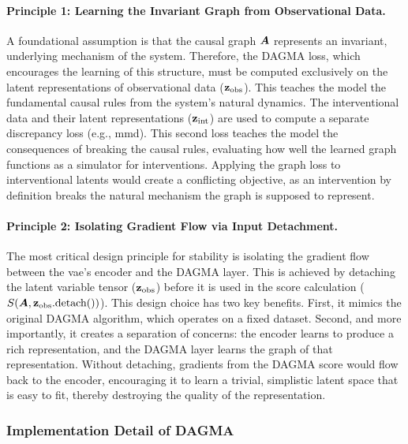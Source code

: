 \paragraph{Principle 1: Learning the Invariant Graph from Observational Data.}
A foundational assumption is that the causal graph ${\bm{A}}$ represents an invariant, underlying mechanism of the system.
Therefore, the DAGMA loss, which encourages the learning of this structure, must be computed exclusively on the latent representations of observational data (${\mathbf{z}}_{\text{obs}}$).
This teaches the model the fundamental causal rules from the system's natural dynamics.
The interventional data and their latent representations (${\mathbf{z}}_{\text{int}}$) are used to compute a separate discrepancy loss (e.g., \gls{mmd}).
This second loss teaches the model the consequences of breaking the causal rules, evaluating how well the learned graph functions as a simulator for interventions.
Applying the graph loss to interventional latents would create a conflicting objective, as an intervention by definition breaks the natural mechanism the graph is supposed to represent.

\paragraph{Principle 2: Isolating Gradient Flow via Input Detachment.}
The most critical design principle for stability is isolating the gradient flow between the \gls{vae}'s encoder and the DAGMA layer.
This is achieved by detaching the latent variable tensor (${\mathbf{z}}_{\text{obs}}$) before it is used in the score calculation ($S({\bm{A}}, {\mathbf{z}}_{\text{obs}}\text{.detach()})$).
This design choice has two key benefits.
First, it mimics the original DAGMA algorithm, which operates on a fixed dataset.
Second, and more importantly, it creates a separation of concerns: the encoder learns to produce a rich representation, and the DAGMA layer learns the graph of that representation.
Without detaching, gradients from the DAGMA score would flow back to the encoder, encouraging it to learn a trivial, simplistic latent space that is easy to fit, thereby destroying the quality of the representation.

\subsubsection{Implementation Detail of DAGMA}
\label{app:dagma:stability}


